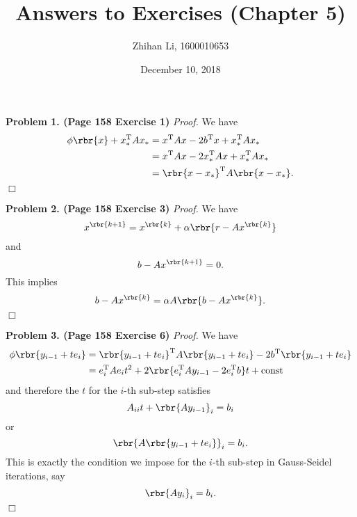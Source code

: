 \documentclass[english, nochinese]{pnote}
\title{Answers to Exercises (Chapter 5)}
\author{Zhihan Li, 1600010653}
\date{December 10, 2018}
\begin{document}
\maketitle

\textbf{Problem 1. (Page 158 Exercise 1)} \textit{Proof.} We have
\begin{equation}
\begin{split}
\phi \rbr{x} + x_{\ast}^{\text{T}} A x_{\ast} &= x^{\text{T}} A x - 2 b^{\text{T}} x + x_{\ast}^{\text{T}} A x_{\ast} \\
&= x^{\text{T}} A x - 2 x_{\ast}^{\text{T}} A x + x_{\ast}^{\text{T}} A x_{\ast} \\
&= \rbr{ x - x_{\ast} }^{\text{T}} A \rbr{ x - x_{\ast} }.
\end{split}
\end{equation}
\hfill$\Box$

\textbf{Problem 2. (Page 158 Exercise 3)} \textit{Proof.} We have
\begin{equation}
x^{\rbr{ k + 1 }} = x^{\rbr{k}} + \alpha \rbr{ r - A x^{\rbr{k}} }
\end{equation}
and
\begin{equation}
b - A x^{\rbr{ k + 1 }} = 0.
\end{equation}
This implies
\begin{equation}
b - A x^{\rbr{k}} = \alpha A \rbr{ b - A x^{\rbr{k}} }.
\end{equation}
\hfill$\Box$

\textbf{Problem 3. (Page 158 Exercise 6)} \textit{Proof.} We have
\begin{equation}
\begin{split}
\phi \rbr{ y_{ i - 1 } + t e_i } &= \rbr{ y_{ i - 1 } + t e_i }^{\text{T}} A \rbr{ y_{ i - 1 } + t e_i } - 2 b^{\text{T}} \rbr{ y_{ i - 1 } + t e_i } \\
&= e_i^{\text{T}} A e_i t^2 + 2 \rbr{ e_i^{\text{T}} A y_{ i - 1 } - 2 e_i^{\text{T}} b } t + \text{const}
\end{split}
\end{equation}
and therefore the $t$ for the $i$-th sub-step satisfies
\begin{equation}
A_{ i i } t + \rbr{ A y_{ i - 1 } }_i = b_i
\end{equation}
or
\begin{equation}
\rbr{ A \rbr{ y_{ i - 1 } + t e_i } }_i = b_i.
\end{equation}
This is exactly the condition we impose for the $i$-th sub-step in Gauss-Seidel iterations, say
\begin{equation}
\rbr{ A y_i }_i = b_i.
\end{equation}
\hfill$\Box$
\end{document}
